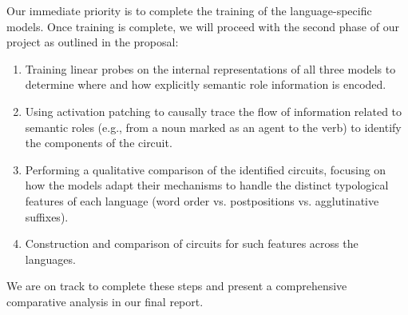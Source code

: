 \documentclass[11pt]{article}
\begin{document}
Our immediate priority is to complete the training of the language-specific models. Once training is complete, we will proceed with the second phase of our project as outlined in the proposal:

\begin{enumerate}
\item Training linear probes on the internal representations of all three models to determine where and how explicitly semantic role information is encoded.
\item Using activation patching to causally trace the flow of information related to semantic roles (e.g., from a noun marked as an agent to the verb) to identify the components of the circuit.
\item Performing a qualitative comparison of the identified circuits, focusing on how the models adapt their mechanisms to handle the distinct typological features of each language (word order vs. postpositions vs. agglutinative suffixes).
\item Construction and comparison of circuits for such features across the languages.
\end{enumerate}

We are on track to complete these steps and present a comprehensive comparative analysis in our final report.



\end{document}

